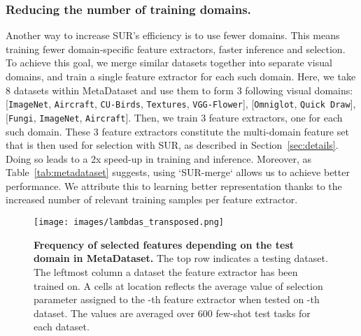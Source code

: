 \documentclass[runningheads]{llncs}
\begin{document}
\subsubsection{Reducing the number of training domains.}
Another way to increase SUR's efficiency is to use fewer domains. This means
training fewer domain-specific feature extractors, faster inference and
selection. To achieve this goal, we merge similar datasets together into
separate visual domains, and train a single feature extractor for each such
domain. Here, we take 8 datasets within MetaDataset and use them to form 3
following visual domains: [\texttt{ImageNet}, \texttt{Aircraft},
  \texttt{CU-Birds}, \texttt{Textures}, \texttt{VGG-Flower}],
[\texttt{Omniglot}, \texttt{Quick Draw}], [\texttt{Fungi}, \texttt{ImageNet},
  \texttt{Aircraft}]. Then, we train 3 feature extractors, one for each such
domain. These 3 feature extractors constitute the multi-domain feature set that
is then used for selection with SUR, as described in Section~\ref{sec:details}.
Doing so leads to a 2x speed-up in training and inference. Moreover, as Table~\ref{tab:metadataset} suggests, using
`SUR-merge` allows us to achieve better performance. We attribute
this to learning better representation thanks to the increased number of
relevant training samples per feature extractor.

\begin{figure}[t!]
\begin{center}
  \texttt{[image: images/lambdas\_transposed.png]}
\end{center}
\caption{\textbf{Frequency of selected features depending on the test domain in MetaDataset.}
  The top row indicates a testing dataset. The leftmost column a dataset the
  feature extractor has been trained on. A cells at location  reflects
  the average value of selection parameter  assigned to the -th feature
  extractor when tested on -th dataset. The values are averaged over 600
  few-shot test tasks for each dataset.}
\label{fig:lambdas}
\end{figure}
\end{document}
